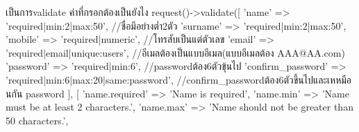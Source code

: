 เป็นการvalidate ค่าที่กรอกต้องเป็นยังไง
request()->validate([
                'name' => 'required|min:2|max:50', //ชื่อมีอย่างต่ำ2ตัว
                'surname' => 'required|min:2|max:50',
                'mobile' => 'required|numeric', //โทรสับเป็นแต่ตัวเลข
                'email' => 'required|email|unique:users', //อีเมลต้องเป็นแบบอีเมล(แบบอีเมลต้อง AAA@AA.com)
                'password' => 'required|min:6', //passwordต้อง6ตัวขุ้นไป
                'confirm_password' => 'required|min:6|max:20|same:password', //confirm_passwordต้อง6ตัวขึ้นไปและเหหมือนกัน password
            ], [
                'name.required' => 'Name is required',
                'name.min' => 'Name must be at least 2 characters.',
                'name.max' => 'Name should not be greater than 50 characters.',





   